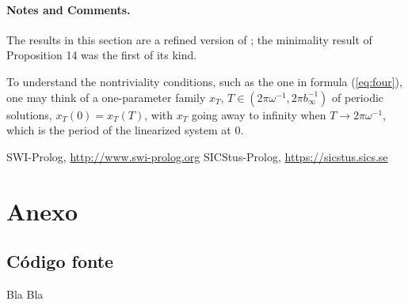 \documentclass{llncs}
\begin{document}
\paragraph{Notes and Comments.}
The results in this section are a
refined version of \cite{clar:eke};
the minimality result of Proposition
14 was the first of its kind.

To understand the nontriviality conditions, such as the one in formula
(\ref{eq:four}), one may think of a one-parameter family
$x_{T}$, $T\in \left(2\pi\omega^{-1}, 2\pi b_{\infty}^{-1}\right)$
of periodic solutions, $x_{T} (0) = x_{T} (T)$,
with $x_{T}$ going away to infinity when $T\to 2\pi \omega^{-1}$,
which is the period of the linearized system at 0.

%
%
\begin{thebibliography}{5}
%
SWI-Prolog,
\url{http://www.swi-prolog.org}
SICStus-Prolog,
\url{https://sicstus.sics.se}


\end{thebibliography}
\clearpage

\section*{Anexo}
\subsection*{Código fonte}

Bla Bla
\end{document}

